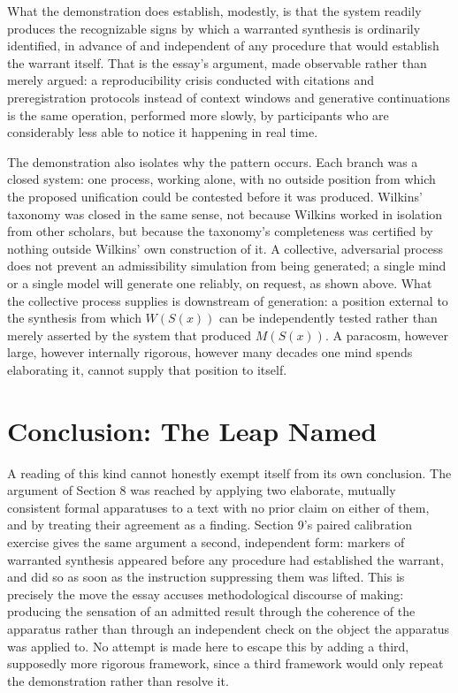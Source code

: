\documentclass[11pt]{article}
\begin{document}
What the demonstration does establish, modestly, is that the system readily produces the recognizable signs by which a warranted synthesis is ordinarily identified, in advance of and independent of any procedure that would establish the warrant itself. That is the essay's argument, made observable rather than merely argued: a reproducibility crisis conducted with citations and preregistration protocols instead of context windows and generative continuations is the same operation, performed more slowly, by participants who are considerably less able to notice it happening in real time.

The demonstration also isolates why the pattern occurs. Each branch was a closed system: one process, working alone, with no outside position from which the proposed unification could be contested before it was produced. Wilkins' taxonomy was closed in the same sense, not because Wilkins worked in isolation from other scholars, but because the taxonomy's completeness was certified by nothing outside Wilkins' own construction of it. A collective, adversarial process does not prevent an admissibility simulation from being generated; a single mind or a single model will generate one reliably, on request, as shown above. What the collective process supplies is downstream of generation: a position external to the synthesis from which $W(S(x))$ can be independently tested rather than merely asserted by the system that produced $M(S(x))$. A paracosm, however large, however internally rigorous, however many decades one mind spends elaborating it, cannot supply that position to itself.

\section{Conclusion: The Leap Named}

A reading of this kind cannot honestly exempt itself from its own conclusion. The argument of Section 8 was reached by applying two elaborate, mutually consistent formal apparatuses to a text with no prior claim on either of them, and by treating their agreement as a finding. Section 9's paired calibration exercise gives the same argument a second, independent form: markers of warranted synthesis appeared before any procedure had established the warrant, and did so as soon as the instruction suppressing them was lifted. This is precisely the move the essay accuses methodological discourse of making: producing the sensation of an admitted result through the coherence of the apparatus rather than through an independent check on the object the apparatus was applied to. No attempt is made here to escape this by adding a third, supposedly more rigorous framework, since a third framework would only repeat the demonstration rather than resolve it.
\end{document}
